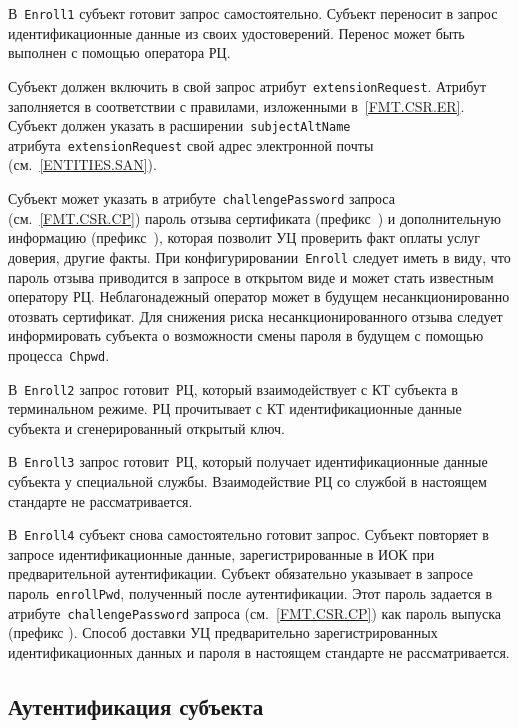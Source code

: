 В~\texttt{Enroll1} субъект готовит запрос самостоятельно.
Субъект переносит в запрос идентификационные данные из своих 
удостоверений. Перенос может быть выполнен с помощью оператора РЦ.

Субъект должен включить в свой запрос атрибут~\texttt{extensionRequest}.
Атрибут заполняется в соответствии с правилами, изложенными 
в~\ref{FMT.CSR.ER}. Субъект должен указать в  
расширении~\texttt{subjectAltName} атрибута~\texttt{extensionRequest} 
свой адрес электронной почты (см.~\ref{ENTITIES.SAN}).

Субъект может указать в атрибуте~\texttt{challengePassword} запроса 
(см.~\ref{FMT.CSR.CP}) пароль отзыва сертификата (префикс~)
и дополнительную информацию (префикс~), которая позволит УЦ 
проверить факт оплаты услуг доверия, другие факты.
%
При конфигурировании~\texttt{Enroll} следует иметь в виду, что пароль 
отзыва приводится в запросе в открытом виде и может стать известным 
оператору РЦ. Неблагонадежный оператор может в будущем несанкционированно 
отозвать сертификат. Для снижения риска несанкционированного отзыва 
следует информировать субъекта о возможности смены пароля в будущем с помощью 
процесса~\texttt{Chpwd}.

В~\texttt{Enroll2} запрос готовит~РЦ, который взаимодействует с КТ 
субъекта в терминальном режиме. РЦ прочитывает с КТ идентификационные 
данные субъекта и сгенерированный открытый ключ.

В~\texttt{Enroll3} запрос готовит~РЦ, который получает идентификационные 
данные субъекта у специальной службы. Взаимодействие РЦ со службой в 
настоящем стандарте не рассматривается.


В~\texttt{Enroll4} субъект снова самостоятельно готовит запрос.
Субъект повторяет в запросе идентификационные данные, 
зарегистрированные в ИОК при предварительной аутентификации. 
%
Субъект обязательно указывает в запросе пароль~\texttt{enrollPwd}, 
полученный после аутентификации. Этот пароль задается в 
атрибуте~\texttt{challengePassword} запроса 
(см.~\ref{FMT.CSR.CP}) как пароль выпуска (префикс ).
%
Способ доставки УЦ предварительно зарегистрированных 
идентификационных данных и пароля в настоящем стандарте 
не рассматривается.

\subsection{Аутентификация субъекта}\label{PROCESSES.Enroll.Auth}

